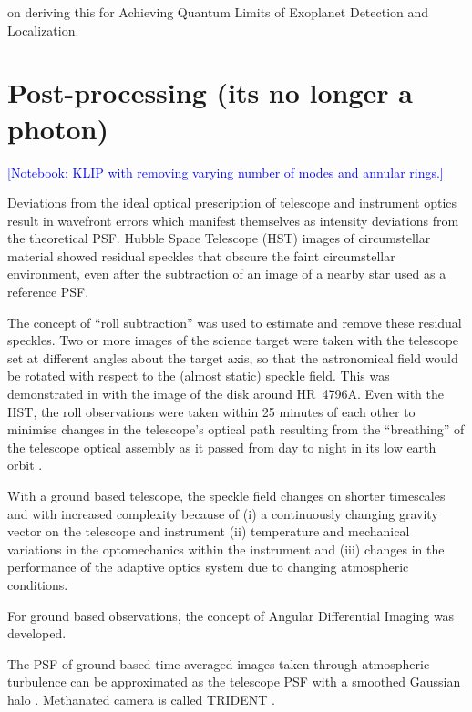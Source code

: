 \documentclass[letterpaper]{ar-1col}
\newcommand{\notebooksuggestion}[1]{\textcolor{blue}{[Notebook: #1]}}
\begin{document}
\citet{Desai23} on deriving this for Achieving Quantum Limits of Exoplanet Detection and Localization.

\section{Post-processing (its no longer a photon)}

\notebooksuggestion{KLIP with removing varying number of modes and annular rings.}

Deviations from the ideal optical prescription of telescope and instrument optics result in wavefront errors which manifest themselves as intensity deviations from the theoretical PSF.
%
Hubble Space Telescope (HST) images of circumstellar material showed residual speckles that obscure the faint circumstellar environment, even after the subtraction of an image of a nearby star used as a reference PSF.

The concept of ``roll subtraction''  \citep{Schneider98} was used to estimate and remove these residual speckles.
%
Two or more images of the science target were taken with the telescope set at different angles about the target axis, so that the astronomical field would be rotated with respect to the (almost static) speckle field.
%
This was demonstrated in \citet{Schneider99} with the image of the disk around HR~4796A.
%
Even with the HST, the roll observations were taken within 25 minutes of each other to minimise changes in the telescope's optical path resulting from the ``breathing'' of the telescope optical assembly as it passed from day to night in its low earth orbit \citep{Bely93}.

With a ground based telescope, the speckle field changes on shorter timescales and with increased complexity because of (i) a continuously changing gravity vector on the telescope and instrument (ii) temperature and mechanical variations in the optomechanics within the instrument and (iii) changes in the performance of the adaptive optics system due to changing atmospheric conditions.

For ground based observations, the concept of Angular Differential Imaging \citep[ADI; ][]{Marois06} was developed.

The PSF of ground based time averaged images taken through atmospheric turbulence can be approximated as the telescope PSF with a smoothed Gaussian halo \citep{Marois00}.
%
Methanated camera is called TRIDENT \citep{Marois05}.
\end{document}
